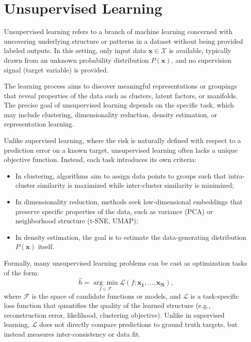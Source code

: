 \section{Unsupervised Learning}\label{sec:unsupervised_learning}
Unsupervised learning refers to a branch of machine learning concerned with
uncovering underlying structure or patterns in a dataset without being provided
labeled outputs. In this setting, only input data $\mathbf{x} \in \mathcal{X}$
is available, typically drawn from an unknown probability distribution
$P(\mathbf{x})$, and no supervision signal (target variable) is provided.

The learning process aims to discover meaningful representations or groupings
that reveal properties of the data such as clusters, latent factors, or
manifolds. The precise goal of unsupervised learning depends on the specific
task, which may include clustering, dimensionality reduction, density
estimation, or representation learning.

Unlike supervised learning, where the risk is naturally defined with respect to
a prediction error on a known target, unsupervised learning often lacks a
unique objective function. Instead, each task introduces its own criteria:
\begin{itemize}
    \item In clustering, algorithms aim to assign data points to groups such that
          intra-cluster similarity is maximized while inter-cluster similarity is
          minimized;
    \item In dimensionality reduction, methods seek low-dimensional embeddings that
          preserve specific properties of the data, such as variance (PCA) or
          neighborhood structure (t-SNE, UMAP);
    \item In density estimation, the goal is to estimate the data-generating distribution
          $P(\mathbf{x})$ itself.
\end{itemize}
Formally, many unsupervised learning problems can be cast as optimization tasks of the form:
\begin{equation}
    \hat{h} = \underset{f \in \mathcal{F}}{\arg\min} \mathcal{L}(f; \mathbf{x_1,\ldots,x_N}),
\end{equation}
where $\mathcal{F}$ is the space of candidate functions or models, and
$\mathcal{L}$ is a task-specific loss function that quantifies the quality of
the learned structure (e.g., reconstruction error, likelihood, clustering
objective). Unlike in supervised learning, $\mathcal{L}$ does not directly
compare predictions to ground truth targets, but instead measures
inter-consistency or data fit.

